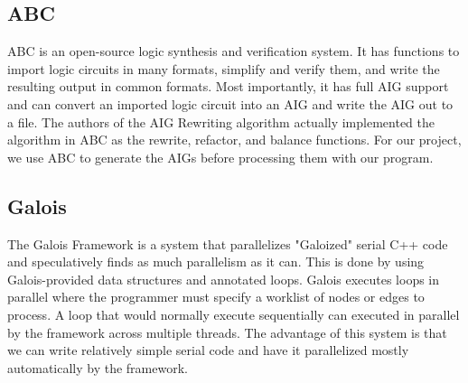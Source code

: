 \documentclass[twocolumn]{article}
\begin{document}
\subsection{ABC}
ABC is an open-source logic synthesis and verification system. It has functions to import logic circuits in many formats, simplify and verify them, and write the resulting output in common formats.  Most importantly, it has full AIG support and can convert an imported logic circuit into an AIG and write the AIG out to a file.  The authors of the AIG Rewriting algorithm actually implemented the algorithm in ABC as the rewrite, refactor, and balance functions. For our project, we use ABC to generate the AIGs before processing them with our program.
\subsection{Galois}
The Galois Framework\cite{GALOIS} is a system that parallelizes "Galoized" serial C++ code and speculatively finds as much parallelism as it can. This is done by using Galois-provided data structures and annotated loops.  \newline\indent
Galois executes loops in parallel where the programmer must specify a worklist of nodes or edges to process.  A loop that would normally execute sequentially can executed in parallel by the framework across multiple threads.  The advantage of this system is that we can write relatively simple serial code and have it parallelized mostly automatically by the framework.
\end{document}
